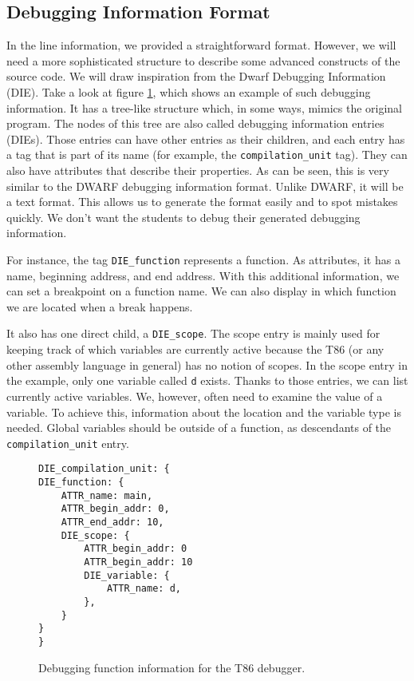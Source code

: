 \subsection{Debugging Information Format}
In the line information, we provided a straightforward format. However, we will
need a more sophisticated structure to describe some advanced constructs of the
source code. We will draw inspiration from the Dwarf Debugging Information
(DIE). Take a look at figure \ref{fig:t86dbg-die}, which shows an example of
such debugging information. It has a tree-like structure which, in some ways,
mimics the original program. The nodes of this tree are also called debugging
information entries (DIEs). Those entries can have other entries as their
children, and each entry has a tag that is part of its name (for example, the
\verb|compilation_unit| tag). They can also have attributes that describe their
properties. As can be seen, this is very similar to the DWARF debugging
information format. Unlike DWARF, it will be a text format. This allows us to
generate the format easily and to spot mistakes quickly. We don't want the
students to debug their generated debugging information.

For instance, the tag \verb|DIE_function| represents a function. As attributes,
it has a name, beginning address, and end address. With this additional
information, we can set a breakpoint on a function name. We can also display in
which function we are located when a break happens.

It also has one direct child, a \verb|DIE_scope|. The scope entry is mainly
used for keeping track of which variables are currently active because the T86
(or any other assembly language in general) has no notion of scopes. In the
scope entry in the example, only one variable called \texttt{d} exists. Thanks
to those entries, we can list currently active variables. We, however, often
need to examine the value of a variable. To achieve this, information about the
location and the variable type is needed. Global variables should be outside of
a function, as descendants of the \verb|compilation_unit| entry.

\begin{figure}
    \begin{lstlisting}
DIE_compilation_unit: {
DIE_function: {
    ATTR_name: main,
    ATTR_begin_addr: 0,
    ATTR_end_addr: 10,
    DIE_scope: {
        ATTR_begin_addr: 0
        ATTR_begin_addr: 10
        DIE_variable: {
            ATTR_name: d,
        },
    }
}
}
    \end{lstlisting}
    \caption{Debugging function information for the T86 debugger.}
    \label{fig:t86dbg-die}
\end{figure}

